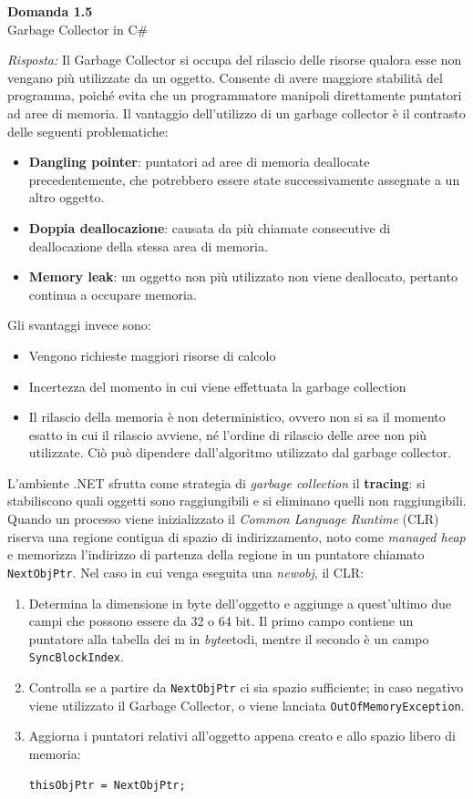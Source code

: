 \documentclass{article}
\newenvironment{problem}[2][Domanda]
    { \begin{mdframed}[backgroundcolor=gray!20] \textbf{#1 #2} \\}
    {  \end{mdframed}}
\newenvironment{solution}
    {\textit{Risposta:}}
    {}
\begin{document}
\begin{problem}{1.5}
Garbage Collector in C\#
\end{problem}
\begin{solution}
Il Garbage Collector si occupa del rilascio delle risorse qualora esse non vengano più utilizzate da un oggetto.
Consente di avere maggiore stabilità del programma, poiché evita che un programmatore manipoli direttamente puntatori ad aree di memoria.
\newline
Il vantaggio dell'utilizzo di un garbage collector è il contrasto delle seguenti problematiche:
\begin{itemize}
	\item \textbf{Dangling pointer}: puntatori ad aree di memoria deallocate precedentemente, che potrebbero essere state successivamente assegnate a un altro oggetto.
	\item \textbf{Doppia deallocazione}: causata da più chiamate consecutive di deallocazione della stessa area di memoria.
	\item \textbf{Memory leak}: un oggetto non più utilizzato non viene deallocato, pertanto continua a occupare memoria.
\end{itemize}
Gli svantaggi invece sono:
\begin{itemize}
	\item Vengono richieste maggiori risorse di calcolo
	\item Incertezza del momento in cui viene effettuata la garbage collection
	\item Il rilascio della memoria è non deterministico, ovvero non si sa il momento esatto in cui il rilascio avviene, né l'ordine di rilascio delle aree non più utilizzate. Ciò può dipendere dall'algoritmo utilizzato dal garbage collector.
\end{itemize}
L'ambiente .NET sfrutta come strategia di \textit{garbage collection} il \textbf{tracing}: si stabiliscono quali oggetti sono raggiungibili e si eliminano quelli non raggiungibili.\newline
Quando un processo viene inizializzato il \textit{Common Language Runtime} (CLR) riserva una regione contigua di spazio di indirizzamento, noto come \textit{managed heap} e memorizza l'indirizzo di partenza della regione in un puntatore chiamato \texttt{NextObjPtr}.
Nel caso in cui venga eseguita una \textit{newobj}, il CLR:
\begin{enumerate}
	\item Determina la dimensione in byte dell'oggetto e aggiunge a quest'ultimo due campi che possono essere da 32 o 64 bit.
	Il primo campo contiene un puntatore alla tabella dei m in \textit{byte}etodi, mentre il secondo è un campo \texttt{SyncBlockIndex}.
	\item Controlla se a partire da \texttt{NextObjPtr} ci sia spazio sufficiente; in caso negativo viene utilizzato il Garbage Collector, o viene lanciata \texttt{OutOfMemoryException}.
	\item Aggiorna i puntatori relativi all'oggetto appena creato e allo spazio libero di memoria:
	\begin{center}
		\texttt{thisObjPtr = NextObjPtr;}


\end{center}
\end{enumerate}
\end{solution}
\end{document}
